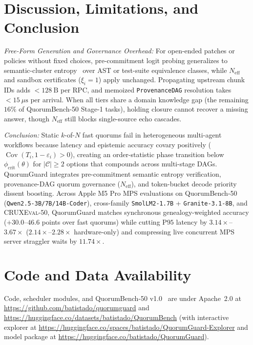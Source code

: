 \documentclass[conference]{IEEEtran}
\def\QG{QuorumGuard}%
\def\QBench{QuorumBench-50}%
\theoremstyle{definition}
\theoremstyle{remark}
\newcommand{\QG}{\textsc{QuorumGuard}}
\newcommand{\QBench}{\textsc{QuorumBench-50}}
\newcommand{\Neff}{N_{\mathrm{eff}}}
\newcommand{\phicrit}{\phi_{\mathrm{crit}}}
\newcommand{\Cov}{\operatorname{Cov}}
\begin{document}
\section{Discussion, Limitations, and Conclusion}\label{sec:conclusion}

\emph{Free-Form Generation and Governance Overhead:} For open-ended patches or policies without fixed choices, pre-commitment logit probing generalizes to semantic-cluster entropy~\cite{kuhn2023semantic,farquhar2024nature} over AST or test-suite equivalence classes, while $\Neff$ and sandbox certificates ($\xi_i = 1$) apply unchanged. Propagating upstream chunk IDs adds $<128~\mathrm{B}$ per RPC, and memoized \texttt{ProvenanceDAG} resolution takes $<15~\mu\mathrm{s}$ per arrival. When all tiers share a domain knowledge gap (the remaining $16\%$ of \QBench{} Stage-1 tasks), holding closure cannot recover a missing answer, though $\Neff$ still blocks single-source echo cascades.

\emph{Conclusion:} Static $k$-of-$N$ fast quorums fail in heterogeneous multi-agent workflows because latency and epistemic accuracy covary positively ($\Cov(T_i, 1 - \varepsilon_i) > 0$), creating an order-statistic phase transition below $\phicrit(\theta)$ for $|\mathcal{C}| \ge 2$ options that compounds across multi-stage DAGs. \QG{} integrates pre-commitment semantic entropy verification, provenance-DAG quorum governance ($\Neff$), and token-bucket decode priority dissent boosting. Across Apple M5 Pro MPS evaluations on \QBench{} (\texttt{Qwen2.5-3B/7B/14B-Coder}), cross-family \texttt{SmolLM2-1.7B} + \texttt{Granite-3.1-8B}, and \textsc{CRUXEval-50}, \QG{} matches synchronous genealogy-weighted accuracy ($+30.0$--$46.6$ points over fast quorums) while cutting $\mathrm{P95}$ latency by $3.14\times$--$3.67\times$ ($2.14\times$--$2.28\times$ hardware-only) and compressing live concurrent MPS server straggler waits by $11.74\times$.

\section*{Code and Data Availability}
Code, scheduler modules, and \QBench{} v1.0~\cite{syed2026quorumbench} are under Apache~2.0 at \url{https://github.com/batistado/quorumguard} and \url{https://huggingface.co/datasets/batistado/QuorumBench} (with interactive explorer at \url{https://huggingface.co/spaces/batistado/QuorumGuard-Explorer} and model package at \url{https://huggingface.co/batistado/QuorumGuard}).



\end{document}
